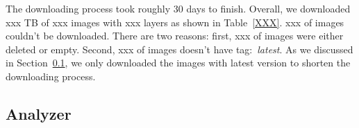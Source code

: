 The downloading process took roughly 30 days to finish.
%
Overall, we downloaded xxx TB of xxx images with xxx layers as shown in Table~\ref{XXX}.
%
xxx of images couldn't be downloaded.
%
There are two reasons: first, xxx of images were either deleted or empty.
%
Second, xxx of images doesn't have tag:~\textit{latest}.
%
As we discussed in Section~\ref{}, we only downloaded the images with latest version to shorten the downloading process.




%
%

\subsection{Analyzer}

